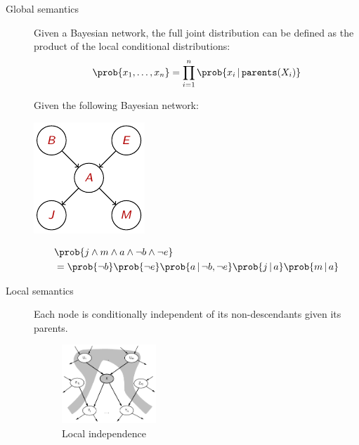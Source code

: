 \begin{description}
    \item[Global semantics] 
        Given a Bayesian network, the full joint distribution can be defined as
        the product of the local conditional distributions:
        \[ \prob{x_1, \dots, x_n} = \prod_{i=1}^{n} \prob{x_i \,\vert\, \texttt{parents}(X_i)} \]

        \begin{example}
            Given the following Bayesian network:

            \begin{minipage}{.3\linewidth}
                \centering
                \includegraphics[width=0.7\linewidth]{img/_global_semantics_example.pdf}
            \end{minipage}
            \begin{minipage}{.6\linewidth}
                \[ 
                    \begin{split}
                        &\prob{j \land m \land a \land \lnot b \land \lnot e} \\
                            &= \prob{\lnot b} \prob{\lnot e} \prob{a \,\vert\, \lnot b, \lnot e}
                                \prob{j \,\vert\, a} \prob{m \,\vert\, a}
                    \end{split}
                \]
            \end{minipage}
        \end{example}

    \item[Local semantics]
        Each node is conditionally independent of its non-descendants given its parents.
        \begin{figure}[H]
            \centering
            \includegraphics[width=0.35\textwidth]{img/_local_independence.pdf}
            \caption{Local independence}
        \end{figure}


\end{description}
